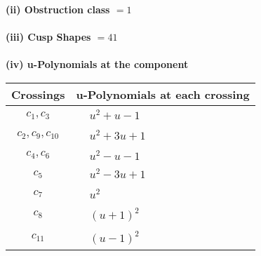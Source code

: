 \documentclass[1p]{elsarticle_modified}
\theoremstyle{definition}
\begin{document}
\flushleft \textbf{(ii) Obstruction class $= 1$}\\~\\
\flushleft \textbf{(iii) Cusp Shapes $= 41$}\\~\\
\newpage\renewcommand{\arraystretch}{1}
\flushleft \textbf{(iv) u-Polynomials at the component}\newline \\
\begin{tabular}{m{50pt}|m{274pt}}
Crossings & \hspace{64pt}u-Polynomials at each crossing \\
\hline $$\begin{aligned}c_{1},c_{3}\end{aligned}$$&$\begin{aligned}
&u^2+u-1
\end{aligned}$\\
\hline $$\begin{aligned}c_{2},c_{9},c_{10}\end{aligned}$$&$\begin{aligned}
&u^2+3 u+1
\end{aligned}$\\
\hline $$\begin{aligned}c_{4},c_{6}\end{aligned}$$&$\begin{aligned}
&u^2- u-1
\end{aligned}$\\
\hline $$\begin{aligned}c_{5}\end{aligned}$$&$\begin{aligned}
&u^2-3 u+1
\end{aligned}$\\
\hline $$\begin{aligned}c_{7}\end{aligned}$$&$\begin{aligned}
&u^2
\end{aligned}$\\
\hline $$\begin{aligned}c_{8}\end{aligned}$$&$\begin{aligned}
&(u+1)^2
\end{aligned}$\\
\hline $$\begin{aligned}c_{11}\end{aligned}$$&$\begin{aligned}
&(u-1)^2
\end{aligned}$\\
\hline
\end{tabular}\\~\\
\end{document}
